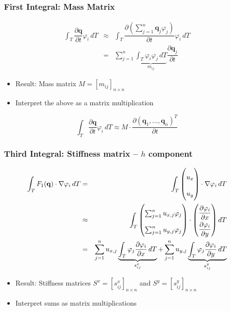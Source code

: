 \documentclass{beamer}
\newcommand{\pd}[2]{\dfrac{\partial #1}{\partial #2}}
\renewcommand{\phi}{\varphi}
\begin{document}
\begin{frame}
  \frametitle{First Integral: Mass Matrix}

  \begin{eqnarray*}
    \int_T \pd {\mathbf{q}}{t} \phi_i \, dT & \approx &
    \int_T \pd {\left( \sum_{j=1}^n \mathbf{q}_j \phi_j \right) }{t} \phi_i \, dT \\
    & = & \sum_{j=1}^n \underbrace{\int_T \phi_i \phi_j \, dT}_{m_{ij}} \pd{\mathbf{q}_j}{t}
  \end{eqnarray*}
  
  \begin{itemize}
  \item Result: Mass matrix $M = [m_{ij}]_{n \times n}$
  \item Interpret the above as a matrix multiplication
  \end{itemize}

  \begin{equation*}
    \int_T \pd {\mathbf{q}}{t} \phi_i \, dT \approx
    M \cdot \pd{
      \left( \mathbf{q}_1 , \dots , \mathbf{q}_n  \right)^T }
    {t}
  \end{equation*}
\end{frame}

\begin{frame}
  \frametitle{Third Integral: Stiffness matrix -- $h$ component}
  \begin{eqnarray*}
    \int_T F_1(\mathbf{q}) \cdot \nabla \phi_i \, dT & = &
    \int_T
    \begin{pmatrix}
      u_x \\ u_y
    \end{pmatrix}
    \cdot \nabla \phi_i \, dT \\
    & \approx & \int_T 
    \begin{pmatrix} 
      \sum_{j=1}^n u_{x,j} \phi_j \\
      \sum_{j=1}^n u_{y,j} \phi_j \\
    \end{pmatrix}
    \cdot 
    {
      \renewcommand\arraystretch{2}
      \begin{pmatrix}
        \pd{\phi_i}{x} \\
        \pd{\phi_i}{y} 
      \end{pmatrix} dT 
    }\\
    & = & \sum_{j=1}^n u_{x,j} \underbrace{\int_T \phi_j \pd{\phi_i}{x} \, dT}_{s^x_{ij}} + \sum_{j=1}^n u_{y,j} \underbrace{\int_T \phi_j \pd{\phi_i}{y} \, dT}_{s^y_{ij}}
  \end{eqnarray*}
  \begin{itemize}
  \item Result: Stiffness matrices $S^x = [s_{ij}^x]_{n \times n}$ and $S^y = [s_{ij}^y]_{n \times n}$
  \item Interpret sums as matrix multiplications
  \end{itemize}
\end{frame}
\end{document}
